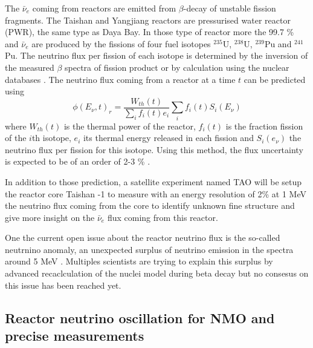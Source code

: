 The $\bar{\nu}_e$ coming from reactors are emitted from $\beta$-decay of unstable fission fragments. The Taishan and Yangjiang reactors are pressurised water reactor (PWR), the same type as Daya Bay. In those type of reactor more the 99.7 \% and $\bar{\nu}_e$ are produced by the fissions of four fuel isotopes $^{235}$U, $^{238}$U, $^{239}$Pu and $^{241}$Pu. The neutrino flux per fission of each isotope is determined by the inversion of the measured $\beta$ spectra of fission product \cite{hahn_antineutrino_1989, mueller_improved_2011, von_feilitzsch_experimental_1982, schreckenbach_determination_1985, huber_determination_2011} or by calculation using the nuclear databases \cite{vogel_reactor_1981, dwyer_spectral_2015}. The neutrino flux coming from a reactor at a time $t$ can be predicted using
\begin{equation}
  \phi(E_\nu, t)_r = \frac{W_{th}(t)}{\sum_i f_i(t) e_i} \sum_i f_i(t) S_i(E_\nu)
\end{equation}
where $W_{th}(t)$ is the thermal power of the reactor, $f_i(t)$ is the fraction fission of the $i$th isotope, $e_i$ its thermal energy released in each fission and $S_i(e_\nu)$ the neutrino flux per fission for this isotope. Using this method, the flux uncertainty is expected to be of an order of 2-3 \% \cite{juno_collaboration_sub-percent_2022}.

In addition to those prediction, a satellite experiment named TAO\cite{juno_collaboration_tao_2020} will be setup the reactor core Taishan -1 to measure with an energy resolution of 2\% at 1 MeV the neutrino flux coming from the core to identify unknown fine structure and give more insight on the $\bar{\nu}_e$ flux coming from this reactor.

One the current open issue about the reactor neutrino flux is the so-called neutrnino anomaly, an unexpected surplus of neutrino emission in the spectra around 5 MeV \cite{mention_reactor_2011}.
Multiples scientists are trying to explain this surplus by advanced recaclculation of the nuclei model during beta decay \cite{kopeikin_reevaluating_2021, letourneau_origin_2023} but no consesus on this issue has been reached yet.

\subsection{Reactor neutrino oscillation for NMO and precise measurements}

